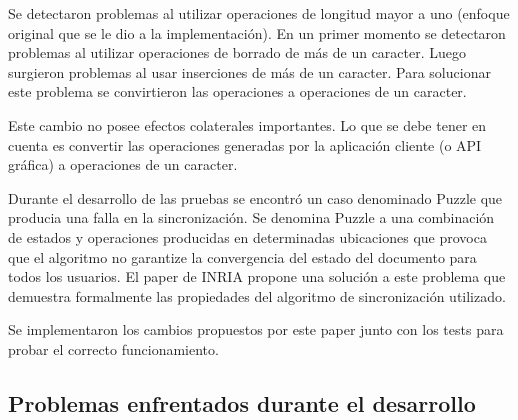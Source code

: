 \documentclass[12pt,a4paper]{article}
\begin{document}
Se detectaron problemas al utilizar operaciones de longitud mayor a uno (enfoque original que se le
dio a la implementación). En un primer momento se detectaron problemas al utilizar operaciones de borrado
de más de un caracter. Luego surgieron problemas al usar inserciones de más de un caracter. Para solucionar
este problema se convirtieron las operaciones a operaciones de un caracter.

Este cambio no posee efectos colaterales importantes. Lo que se debe tener en cuenta es convertir las
operaciones generadas por la aplicación cliente (o API gráfica) a operaciones de un caracter.

Durante el desarrollo de las pruebas se encontró un caso denominado Puzzle\cite{inria} que producia una falla en la
sincronización. Se denomina Puzzle a una combinación de estados y operaciones producidas en determinadas
ubicaciones que provoca que el algoritmo no garantize la convergencia del estado del documento para todos 
los usuarios. El paper de INRIA\cite{inria} propone una solución a este problema que demuestra formalmente las 
propiedades del algoritmo de sincronización utilizado.

Se implementaron los cambios propuestos por este paper junto con los tests para probar el correcto funcionamiento.


\subsection{Problemas enfrentados durante el desarrollo}
\end{document}
